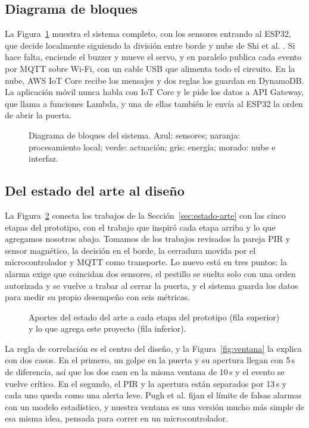 \documentclass[manuscript,screen,nonacm]{acmart}
\begin{document}
\subsection{Diagrama de bloques}
La Figura~\ref{fig:bloques} muestra el sistema completo, con los sensores entrando al ESP32, que decide localmente siguiendo la división entre borde y nube de Shi et al. \cite{shi2016edge}. Si hace falta, enciende el buzzer y mueve el servo, y en paralelo publica cada evento por MQTT sobre Wi-Fi, con un cable USB que alimenta todo el circuito. En la nube, AWS IoT Core recibe los mensajes y dos reglas los guardan en DynamoDB. La aplicación móvil nunca habla con IoT Core y le pide los datos a API Gateway, que llama a funciones Lambda, y una de ellas también le envía al ESP32 la orden de abrir la puerta.

\begin{figure}[htbp]
\centering
{}
\caption{Diagrama de bloques del sistema. Azul: sensores; naranja: procesamiento local; verde: actuación; gris: energía; morado: nube e interfaz.}
\label{fig:bloques}
\end{figure}

\subsection{Del estado del arte al diseño}
La Figura~\ref{fig:aportes} conecta los trabajos de la Sección~\ref{sec:estado-arte} con las cinco etapas del prototipo, con el trabajo que inspiró cada etapa arriba y lo que agregamos nosotros abajo. Tomamos de los trabajos revisados la pareja PIR y sensor magnético, la decisión en el borde, la cerradura movida por el microcontrolador y MQTT como transporte. Lo nuevo está en tres puntos: la alarma exige que coincidan dos sensores, el pestillo se suelta solo con una orden autorizada y se vuelve a trabar al cerrar la puerta, y el sistema guarda los datos para medir su propio desempeño con seis métricas.

\begin{figure}[htbp]
\centering
{}
\caption{Aportes del estado del arte a cada etapa del prototipo (fila superior) y lo que agrega este proyecto (fila inferior).}
\label{fig:aportes}
\end{figure}

La regla de correlación es el centro del diseño, y la Figura~\ref{fig:ventana} la explica con dos casos. En el primero, un golpe en la puerta y su apertura llegan con 5\,s de diferencia, así que los dos caen en la misma ventana de 10\,s y el evento se vuelve crítico. En el segundo, el PIR y la apertura están separados por 13\,s y cada uno queda como una alerta leve. Pugh et al. \cite{pugh2015fusion} fijan el límite de falsas alarmas con un modelo estadístico, y nuestra ventana es una versión mucho más simple de esa misma idea, pensada para correr en un microcontrolador.
\end{document}
